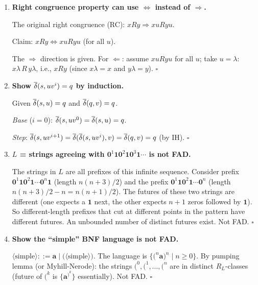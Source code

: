 \begin{enumerate}[{2.}1.]
\item \textbf{Right congruence property can use $\Leftrightarrow$ instead of $\Rightarrow$.}

The original right congruence (RC): $xRy\Rightarrow xuRyu$.

Claim: $xRy\Leftrightarrow xuRyu$ (for all $u$).

The $\Rightarrow$ direction is given. For $\Leftarrow$: assume $xuRyu$ for all $u$; take $u=\lambda$: $x\lambda\,R\,y\lambda$, i.e., $xRy$ (since $x\lambda=x$ and $y\lambda=y$). $\square$

\item \textbf{Show $\overline{\delta}(s,uv^i)=q$ by induction.}

Given $\overline{\delta}(s,u)=q$ and $\overline{\delta}(q,v)=q$.

\textit{Base} ($i=0$): $\overline{\delta}(s,uv^0)=\overline{\delta}(s,u)=q$. \checkmark

\textit{Step}: $\overline{\delta}(s,uv^{i+1})=\overline{\delta}(\overline{\delta}(s,uv^i),v)=\overline{\delta}(q,v)=q$ (by IH). $\square$

\item \textbf{$L$ = strings agreeing with $\mathbf{0}^1\mathbf{1}\mathbf{0}^2\mathbf{1}\mathbf{0}^3\mathbf{1}\cdots$ is not FAD.}

The strings in $L$ are all prefixes of this infinite sequence. Consider prefix $\mathbf{0}^1\mathbf{1}\mathbf{0}^2\mathbf{1}\cdots\mathbf{0}^n\mathbf{1}$ (length $n(n+3)/2$) and the prefix $\mathbf{0}^1\mathbf{1}\mathbf{0}^2\mathbf{1}\cdots\mathbf{0}^n$ (length $n(n+3)/2-n=n(n+1)/2$). The futures of these two strings are different (one expects a $\mathbf{1}$ next, the other expects $n+1$ zeros followed by $\mathbf{1}$). So different-length prefixes that cut at different points in the pattern have different futures. An unbounded number of distinct futures exist. Not FAD. $\square$

\item \textbf{Show the ``simple'' BNF language is not FAD.}

$\langle\text{simple}\rangle ::= \mathbf{a}\mid\mathbf{(}\langle\text{simple}\rangle\mathbf{)}$. The language is $\{\mathbf{(}^n\mathbf{a}\mathbf{)}^n\mid n\geq 0\}$. By pumping lemma (or Myhill-Nerode): the strings $\mathbf{(}^0,\mathbf{(}^1,\ldots,\mathbf{(}^n$ are in distinct $R_L$-classes (future of $\mathbf{(}^k$ is $\{\mathbf{a}^{\mathbf{)}^k}\}$ essentially). Not FAD. $\square$


\end{enumerate}
